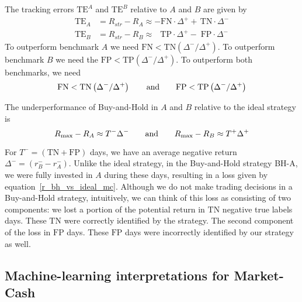 \documentclass{article}
\begin{document}
The tracking errors  $\text{TE}^{A}$ and $\text{TE}^{B}$ relative to $A$ and
$B$ are given by
\begin{equation}
\begin{split}
    \text{TE}_{A} & = R_{str}-R_{A} \approx  -\text{FN} \cdot \Delta^{+}
    + \,\text{TN}\cdot \Delta^{-}\\
  \text{TE}_{B} &= R_{str}-R_{B} \approx \;\;\, \text{TP}\cdot \Delta^{+} -\; \text{FP}\cdot \Delta^{-}
\end{split}
\end{equation}
To outperform benchmark $A$ we need 
$\text{FN}< \text{TN}\left(\Delta^{-}/\Delta^{+}\right)$. To outperform benchmark $B$
we need the $\text{FP}< \text{TP}\left(\Delta^{-}/\Delta^{+}\right)$. To outperform both benchmarks, we
need
\begin{equation}
    \text{FN}< \text{TN}\left(\Delta^{-}/\Delta^{+}\right) \qquad \hbox{and} \qquad
    \text{FP}< \text{TP}\left(\Delta^{-}/\Delta^{+}\right)
    \label{min_requirements}
\end{equation}

The underperformance of Buy-and-Hold in $A$ and $B$ relative to the ideal strategy is
\begin{equation}
    R_{\max}-R_{A}  \approx T^{-} \Delta^{-} \qquad\hbox{and}\qquad
     R_{\max}-R_{B}  \approx T^{+}\Delta^{+} 
\label{r_bh_vs_ideal_mc}
\end{equation}

For $T^{-}=(\text{TN}+\text{FP})$ days, we have an average negative return $\Delta^{-}=(r_{B}^{-}-r_{A}^{-})$. Unlike the ideal strategy, in the Buy-and-Hold strategy BH-A, we were fully invested in $A$ during these days, resulting in a loss given by equation~\eqref{r_bh_vs_ideal_mc}. Although we do not make trading decisions in a Buy-and-Hold strategy,
intuitively, we can think of this loss as consisting of two components: we lost a portion of the potential return 
in $\text{TN}$ negative true labels days. These $\text{TN}$ were correctly identified by the strategy. The second component of the loss in $\text{FP}$ days.  These
$\text{FP}$ days were incorrectly identified by our strategy as well.


\subsection{Machine-learning interpretations for Market-Cash}
\end{document}
